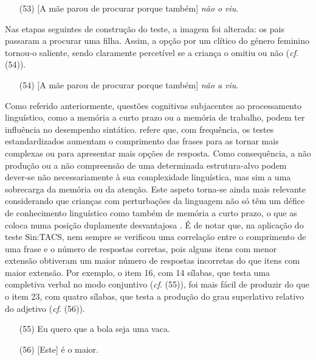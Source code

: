 \documentclass[output=paper,colorlinks,citecolor=brown,booklanguage=portuguese]{langscibook}
\begin{document}
\begin{enumerate}[align=left]
    \item [(53)] [A mãe parou de procurar porque também] \emph{não o viu}.  
\end{enumerate}

Nas etapas seguintes de construção do teste, a imagem foi alterada: os pais passaram a procurar uma filha. Assim, a opção por um clítico do género feminino tornou-o saliente, sendo claramente percetível se a criança o omitiu ou não (\emph{cf}. (54)).

\begin{enumerate}[align=left]
    \item [(54)] [A mãe parou de procurar porque também] \emph{não a viu}.
\end{enumerate}

Como referido anteriormente, questões cognitivas subjacentes ao processamento linguístico, como a memória a curto prazo ou a memória de trabalho, podem ter influência no desempenho sintático. \citet{TagerFlushberg2000} refere que, com frequência, os testes estandardizados aumentam o comprimento das frases para as tornar mais complexas ou para apresentar mais opções de resposta. Como consequência, a não produção ou a não compreensão de uma determinada estrutura-alvo podem dever-se não necessariamente à sua complexidade linguística, mas sim a uma sobrecarga da memória ou da atenção. Este aspeto torna-se ainda mais relevante considerando que crianças com perturbações da linguagem não só têm um défice de conhecimento linguístico como também de memória a curto prazo, o que as coloca numa posição duplamente desvantajosa \citep{Vance2008}. É de notar que, na aplicação do teste Sin:TACS, nem sempre se verificou uma correlação entre o comprimento de uma frase e o número de respostas corretas, pois alguns itens com menor extensão obtiveram um maior número de respostas incorretas do que itens com maior extensão. Por exemplo, o item 16, com 14 sílabas, que testa uma completiva verbal no modo conjuntivo (\emph{cf}. (55)), foi mais fácil de produzir do que o item 23, com quatro sílabas, que testa a produção do grau superlativo relativo do adjetivo (\emph{cf}. (56)). 

\begin{enumerate}[align=left]
    \item [(55)] Eu quero que a bola seja uma vaca.
\item[(56)] [Este] é o maior.
\end{enumerate}
\end{document}
